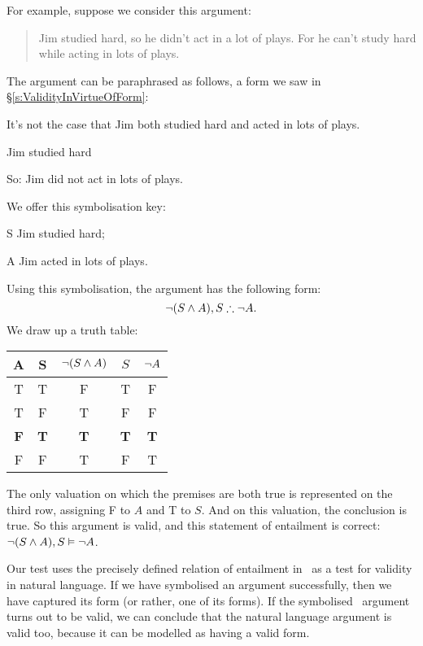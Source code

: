 For example, suppose we consider this argument: \begin{quote}
	Jim studied hard, so he didn't act in a lot of plays. For he can't study hard while acting in lots of plays.
\end{quote}  The argument can be paraphrased as follows, a form we saw in §\ref{s:ValidityInVirtueOfForm}:\begin{earg}
		\item[] \textsf{It's not the case that} Jim \textsf{both} studied hard \textsf{and} acted in lots of plays.
		\item[] Jim studied hard
		\item[So:] Jim did \textsf{not} act in lots of plays.
	\end{earg} We offer this symbolisation key: \begin{ekey}
	\item[S] Jim studied hard;
	\item[A] Jim acted in lots of plays.
\end{ekey}
Using this symbolisation, the argument has the following form: $$\neg(S \wedge A), S \mathrel{\therefore} \neg A.$$ We draw up a truth table: \begin{center}
	\begin{tabular}{cc|c|c|c}
	\toprule
A & S & $\neg(S \wedge A)$ & $S$ & $\neg A$ \\
\midrule
T & T & F & T & F \\
T & F & T & F & F \\
\textbf{F} & \textbf{T} & \textbf{T} & \textbf{T} & \textbf{T} \\
F & F & T & F & T \\ \bottomrule
\end{tabular} 
\end{center} The only valuation on which the premises are both true is represented on the third row, assigning F to $A$ and T to $S$. And on this valuation, the conclusion is true. So this argument is valid, and this statement of entailment is correct: $\neg(S \wedge A), S \vDash \neg A$.


Our test uses the precisely defined relation of entailment in \TFL\ as a test for validity in natural language. If we have symbolised an argument successfully, then we have captured its form (or rather, one of its forms). If the symbolised \TFL\ argument turns out to be valid, we can conclude that the natural language argument is valid too, because it can be modelled as having a valid form.


